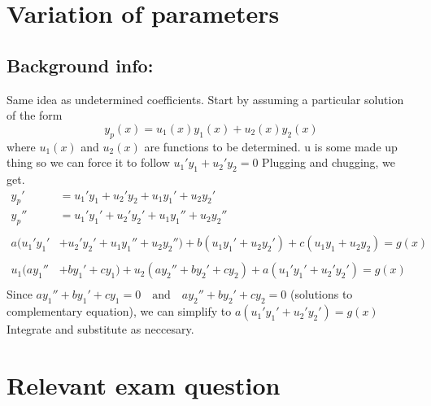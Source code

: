 \documentclass{article}
\begin{document}
\hypertarget{variationofparameters}{
    \section*{Variation of parameters}
    \subsection*{Background info:}
    Same idea as undetermined coefficients. Start by assuming a particular solution of the form
	\begin{equation*}
	y_p(x) = u_1(x)y_1(x) + u_2(x)y_2(x) 
	\end{equation*}
	where $u_1(x)$ and $u_2(x)$ are functions to be determined. u is some made up thing so we can force it to follow $u_1' y_1 + u_2' y_2 = 0$
	Plugging and chugging, we get.
	\begin{align*}
		y_p' &= u_1' y_1 + u_2' y_2 + u_1 y_1' + u_2 y_2' \\
		y_p'' &= u_1' y_1' + u_2' y_2' + u_1 y_1'' + u_2 y_2'' \\
		\\
		a(u_1' y_1' &+ u_2' y_2' + u_1 y_1'' + u_2 y_2'')  + b(u_1 y_1' + u_2 y_2') + c(u_1 y_1 + u_2 y_2) = g(x) \\
		\\
		u_1(ay_1'' &+ by_1' + cy_1) + u_2(ay_2'' + by_2' + cy_2) + a(u_1' y_1' + u_2' y_2') = g(x)\\
		\end{align*} 
		Since $ay_1'' + by_1' + cy_1 = 0 \quad \text{and} \quad ay_2'' + by_2' + cy_2 = 0$ (solutions to complementary equation), we can simplify to 
		$a(u_1' y_1' + u_2' y_2') = g(x)$
Integrate and substitute as neccesary.
}
\section*{Relevant exam question}
\end{document}

